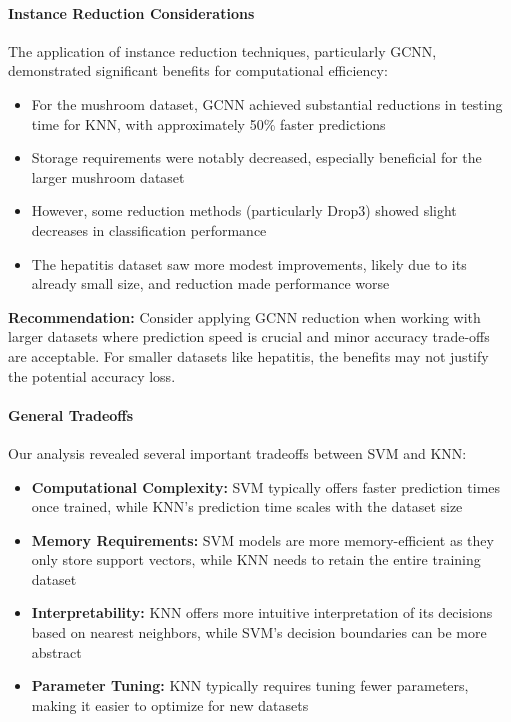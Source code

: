 \paragraph{Instance Reduction Considerations}
The application of instance reduction techniques, particularly GCNN, demonstrated significant benefits for computational efficiency:

\begin{itemize}
    \item For the mushroom dataset, GCNN achieved substantial reductions in testing time for KNN, with approximately 50\% faster predictions
    \item Storage requirements were notably decreased, especially beneficial for the larger mushroom dataset
    \item However, some reduction methods (particularly Drop3) showed slight decreases in classification performance
    \item The hepatitis dataset saw more modest improvements, likely due to its already small size, and reduction made performance worse
\end{itemize}

\textbf{Recommendation:} Consider applying GCNN reduction when working with larger datasets where prediction speed is crucial and minor accuracy trade-offs are acceptable. For smaller datasets like hepatitis, the benefits may not justify the potential accuracy loss.


\paragraph{General Tradeoffs}
Our analysis revealed several important tradeoffs between SVM and KNN:

\begin{itemize}
    \item \textbf{Computational Complexity:} SVM typically offers faster prediction times once trained, while KNN's prediction time scales with the dataset size
    \item \textbf{Memory Requirements:} SVM models are more memory-efficient as they only store support vectors, while KNN needs to retain the entire training dataset
    \item \textbf{Interpretability:} KNN offers more intuitive interpretation of its decisions based on nearest neighbors, while SVM's decision boundaries can be more abstract
    \item \textbf{Parameter Tuning:} KNN typically requires tuning fewer parameters, making it easier to optimize for new datasets
\end{itemize}

